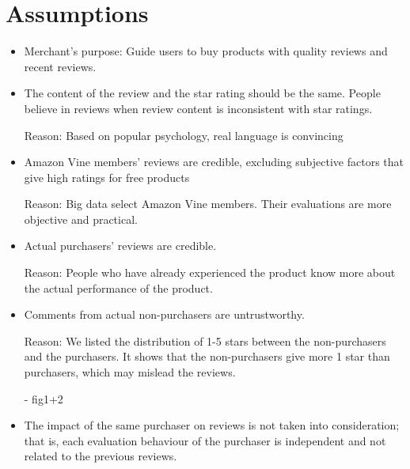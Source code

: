 \documentclass{mcmthesis}
\begin{document}
\section{Assumptions}
\begin{itemize}
  \item Merchant's purpose: Guide users to buy products with quality reviews and recent reviews.
\end{itemize}
\begin{itemize}
  \item The content of the review and the star rating should be the same. People believe in reviews when review content is inconsistent with star ratings.

Reason: Based on popular psychology, real language is convincing 
\end{itemize}
\begin{itemize}
  \item Amazon Vine members' reviews are credible, excluding subjective factors that give high ratings for free products

Reason: Big data select Amazon Vine members. Their evaluations are more objective and practical.
\end{itemize}
\begin{itemize}
  \item Actual purchasers' reviews are credible.

Reason: People who have already experienced the product know more about the actual performance of the product.
\end{itemize}
\begin{itemize}
  \item Comments from actual non-purchasers are untrustworthy.

Reason: We listed the distribution of 1-5 stars between the non-purchasers and the purchasers. It shows that the non-purchasers give more 1 star than purchasers, which may mislead the reviews.

- fig1+2
\end{itemize}
\begin{itemize}
  \item The impact of the same purchaser on reviews is not taken into consideration; that is, each evaluation behaviour of the purchaser is independent and not related to the previous reviews.
\end{itemize}
\end{document}
